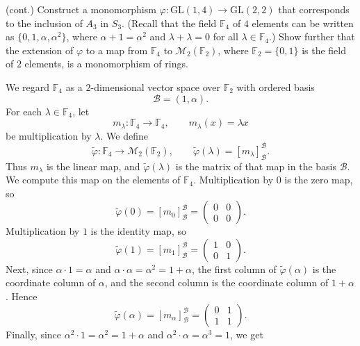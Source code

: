 \documentclass[../Odyssey_Project.tex]{subfiles}
\begin{document}
\begin{exercise}
\label{ex:4.2}
(cont.) Construct a monomorphism $\varphi \colon \mathrm{GL}(1, 4) \to \mathrm{GL}(2, 2)$ that corresponds to the inclusion of $A_3$ in $S_3$. (Recall that the field $\mathbb{F}_4$ of $4$ elements can be written as $\{0, 1, \alpha, \alpha^2\}$, where $\alpha + 1 = \alpha^2$ and $\lambda + \lambda = 0$ for all $\lambda \in \mathbb{F}_4$.) Show further that the extension of $\varphi$ to a map from $\mathbb{F}_4$ to $\mathcal{M}_2(\mathbb{F}_2)$, where $\mathbb{F}_2 = \{0, 1\}$ is the field of $2$ elements, is a monomorphism of rings.
\end{exercise}
\begin{solution}
We regard $\mathbb{F}_4$ as a $2$-dimensional vector space over $\mathbb{F}_2$ with ordered basis
\[
    \mathcal B=(1,\alpha).
\]
For each $\lambda\in \mathbb{F}_4$, let
\[
    m_\lambda \colon \mathbb{F}_4\to \mathbb{F}_4,
    \qquad
    m_\lambda(x)=\lambda x
\]
be multiplication by $\lambda$. We define
\[
    \widetilde{\varphi}\colon \mathbb{F}_4\to \mathcal{M}_2(\mathbb{F}_2),
    \qquad
    \widetilde{\varphi}(\lambda)=[m_\lambda]_{\mathcal B}^{\mathcal B}.
\]
Thus $m_\lambda$ is the linear map, and $\widetilde{\varphi}(\lambda)$ is the matrix of that map in the basis $\mathcal B$.\\
We compute this map on the elements of $\mathbb{F}_4$. Multiplication by $0$ is the zero map, so
\[
    \widetilde{\varphi}(0)=[m_0]_{\mathcal B}^{\mathcal B}=
    \begin{pmatrix}
        0&0\\
        0&0
    \end{pmatrix}.
\]
Multiplication by $1$ is the identity map, so
\[
    \widetilde{\varphi}(1)=[m_1]_{\mathcal B}^{\mathcal B}=
    \begin{pmatrix}
        1&0\\
        0&1
    \end{pmatrix}.
\]
Next, since $\alpha\cdot 1=\alpha$ and $\alpha\cdot \alpha=\alpha^2=1+\alpha$, the first column of $\widetilde{\varphi}(\alpha)$ is the coordinate column of $\alpha$, and the second column is the coordinate column of $1+\alpha$. Hence
\[
    \widetilde{\varphi}(\alpha)=[m_\alpha]_{\mathcal B}^{\mathcal B}=
    \begin{pmatrix}
        0&1\\
        1&1
    \end{pmatrix}.
\]
Finally, since $\alpha^2\cdot 1=\alpha^2=1+\alpha$ and $\alpha^2\cdot\alpha=\alpha^3=1$, we get
\[
\]
\end{solution}
\end{document}
